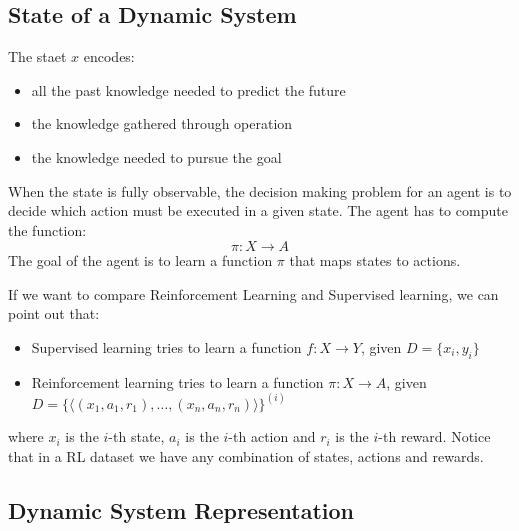 \subsection{State of a Dynamic System}

The staet $x$ encodes:
\begin{itemize}
    \item all the past knowledge needed to predict the future
    \item the knowledge gathered through operation
    \item the knowledge needed to pursue the goal
\end{itemize}

When the state is fully observable, the decision making problem for an agent is to decide which action must be executed in a given state. The agent has to compute the function:
\begin{equation}
    \pi : X \xrightarrow{} A
\end{equation}
The goal of the agent is to learn a function $\pi$ that maps states to actions.

If we want to compare Reinforcement Learning and Supervised learning, we can point out that:
\begin{itemize}
    \item Supervised learning tries to learn a function $f : X \xrightarrow{} Y$, given $D = \{x_{i}, y_{i}\}$
    \item Reinforcement learning tries to learn a function $\pi : X \xrightarrow{} A$, given\\ 
    $D = \{ \langle (x_{1}, a_{1}, r_{1}), \dots, (x_{n}, a_{n}, r_{n}) \rangle \}^{(i)}$
\end{itemize}
where $x_{i}$ is the $i$-th state, $a_{i}$ is the $i$-th action and $r_{i}$ is the $i$-th reward. Notice that in a RL dataset we have any combination of states, actions and rewards.

\subsection{Dynamic System Representation}

